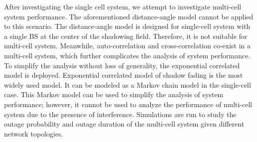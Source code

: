 \par After investigating the single cell system, we attempt to investigate multi-cell system performance. The aforementioned distance-angle model cannot be applied to this scenario. The distance-angle model is designed for single-cell system with a single BS at the center of the shadowing field. Therefore, it is not suitable for multi-cell system. Meanwhile, auto-correlation and cross-correlation co-exist in a multi-cell system, which further complicates the analysis of system performance. To simplify the analysis without loss of generality, the exponential correlated model is deployed. Exponential correlated model of shadow fading is the most widely used model. It can be modeled as a Markov chain model in the single-cell case. This Markov model can be used to simplify the analysis of system performance; however, it cannot be used to analyze the performance of multi-cell system due to the presence of interference. Simulations are run to study the outage probability and outage duration of the multi-cell system given different network topologies. 


